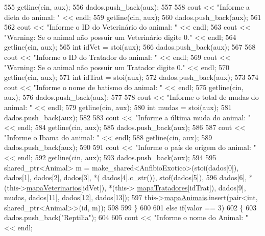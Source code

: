 \begin{DoxyCode}
555         getline(cin, aux);
556         dados.push\_back(aux);
557 
558         cout << \textcolor{stringliteral}{"Informe a dieta do animal: "} << endl;
559         getline(cin, aux);
560         dados.push\_back(aux);
561 
562         cout << \textcolor{stringliteral}{"Informe o ID do Veterinário do animal: "} << endl;
563         cout << \textcolor{stringliteral}{"Warning: Se o animal não possuir um Veterinário digite 0."} << endl;
564         getline(cin, aux);
565         \textcolor{keywordtype}{int} idVet = stoi(aux);
566         dados.push\_back(aux);
567 
568         cout << \textcolor{stringliteral}{"Informe o ID do Tratador do animal: "} << endl;
569         cout << \textcolor{stringliteral}{"Warning: Se o animal não possuir um Tratador digite 0."} << endl;
570         getline(cin, aux);
571         \textcolor{keywordtype}{int} idTrat = stoi(aux);
572         dados.push\_back(aux);
573 
574         cout << \textcolor{stringliteral}{"Informe o nome de batismo do animal: "} << endl;
575         getline(cin, aux);
576         dados.push\_back(aux);
577 
578         cout << \textcolor{stringliteral}{"Informe o total de mudas do animal: "} << endl;
579         getline(cin, aux);
580         \textcolor{keywordtype}{int} mudas = stoi(aux);
581         dados.push\_back(aux);
582 
583         cout << \textcolor{stringliteral}{"Informe a última muda do animal: "} << endl;
584         getline(cin, aux);
585         dados.push\_back(aux);
586 
587         cout << \textcolor{stringliteral}{"Informe o Ibama do animal: "} << endl;
588         getline(cin, aux);
589         dados.push\_back(aux);
590 
591         cout << \textcolor{stringliteral}{"Informe o país de origem do animal: "} << endl;
592         getline(cin, aux);
593         dados.push\_back(aux);
594 
595         shared\_ptr<Animal> m = make\_shared<AnfibioExotico>(stoi(dados[0]), dados[1], dados[2], dados[3], *(
      dados[4].c\_str()), stof(dados[5]),
596                     dados[6], *(this->\hyperlink{classPetFera_a2bed2112a627bbdb3c0338654330a1ab}{mapaVeterinarios}[idVet]), *(this->
      \hyperlink{classPetFera_ac85920fc6c1471743838e6fe4444304d}{mapaTratadores}[idTrat]), dados[9], mudas, dados[11], dados[12], dados[13]);
597         this->\hyperlink{classPetFera_ab0ba5fe6332bcffdabb7b03001280697}{mapaAnimais}.insert(pair<\textcolor{keywordtype}{int}, shared\_ptr<Animal>>(\textcolor{keywordtype}{id}, m));
598 
599     \}
600 
601     \textcolor{keywordflow}{else} \textcolor{keywordflow}{if}(valor == 3)
602     \{
603         dados.push\_back(\textcolor{stringliteral}{"Reptilia"});
604 
605         cout << \textcolor{stringliteral}{"Informe o nome do Animal: "} << endl;

\end{DoxyCode}
